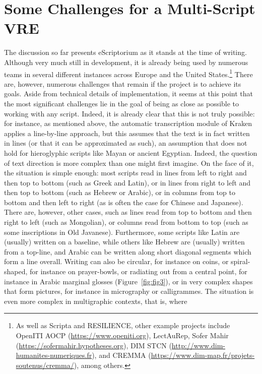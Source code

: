 \section{Some Challenges for a Multi-Script VRE}

The discussion so far presents eScriptorium as it stands at the time of
writing. Although very much still in development, it is already being used by
numerous teams in several different instances across Europe and the United
States.\footnote{As well as Scripta and RESILIENCE, other example projects
include OpenITI AOCP (\url{https://www.openiti.org}), LectAuRep, Sofer Mahir
(\url{https://sofermahir.hypotheses.org}), DIM STCN
(\url{http://www.dim-humanites-numeriques.fr}), and CREMMA
(\url{https://www.dim-map.fr/projets-soutenus/cremma/}), among others.} There
are, however, numerous challenges that remain if the project is to achieve its
goals. Aside from technical details of implementation, it
seems at this point that the most significant challenges lie in the goal of
being as close as possible to working with any script. Indeed, it is already
clear that this is not truly possible: for instance, as mentioned above, the
automatic transcription module of Kraken applies a line-by-line approach, but
this assumes that the text is in fact written in lines (or that it can be
approximated as such), an assumption that does not hold for hieroglyphic
scripts like Mayan or ancient Egyptian. Indeed, the question of text direction
is more complex than one might first imagine. On the face of it, the situation
is simple enough: most scripts read in lines from left to right and then top to
bottom (such as Greek and Latin), or in lines from right to left and then top
to bottom (such as Hebrew or Arabic), or in columns from top to bottom and then
left to right (as is often the case for Chinese and Japanese). There are,
however, other cases, such as lines read from top to bottom and then right to
left (such as Mongolian), or columns read from bottom to top (such as some
inscriptions in Old Javanese). Furthermore, some scripts like Latin are
(usually) written on a baseline, while others like Hebrew are (usually) written
from a top-line, and Arabic can be written along short diagonal segments which
form a line overall. Writing can also be circular, for instance on coins, or
spiral-shaped, for instance on prayer-bowls, or radiating out from a central
point, for instance in Arabic marginal glosses (Figure~\ref{fig:fig3}), or in very complex
shapes that form pictures, for instance in micrography or calligrammes. The
situation is even more complex in multigraphic contexts, that is, where
